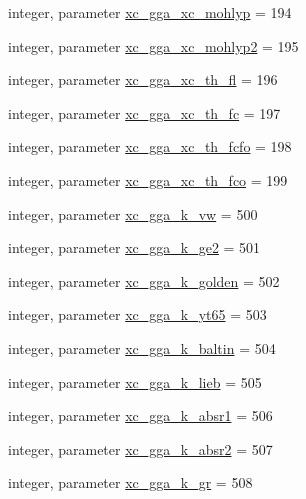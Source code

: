 \begin{DoxyCompactItemize}
\item 
integer, parameter \hyperlink{classlibxc__funcs__m_af627a530ca1f867510017b189507dfec}{xc\-\_\-gga\-\_\-xc\-\_\-mohlyp} = 194
\item 
integer, parameter \hyperlink{classlibxc__funcs__m_a85e87e7fd208c942e92ea7ba65d059a5}{xc\-\_\-gga\-\_\-xc\-\_\-mohlyp2} = 195
\item 
integer, parameter \hyperlink{classlibxc__funcs__m_aa04dcc0460f7a3a43e0a29bdec59524f}{xc\-\_\-gga\-\_\-xc\-\_\-th\-\_\-fl} = 196
\item 
integer, parameter \hyperlink{classlibxc__funcs__m_ab2a4479b768f91a95decd4dcce60ce92}{xc\-\_\-gga\-\_\-xc\-\_\-th\-\_\-fc} = 197
\item 
integer, parameter \hyperlink{classlibxc__funcs__m_a4c1444d5f088b32488ec4f04a0a6467d}{xc\-\_\-gga\-\_\-xc\-\_\-th\-\_\-fcfo} = 198
\item 
integer, parameter \hyperlink{classlibxc__funcs__m_a118c61bedf0f29ea879522d3cd301032}{xc\-\_\-gga\-\_\-xc\-\_\-th\-\_\-fco} = 199
\item 
integer, parameter \hyperlink{classlibxc__funcs__m_ae7cbe5f41b864af681ffea0a07ad6a37}{xc\-\_\-gga\-\_\-k\-\_\-vw} = 500
\item 
integer, parameter \hyperlink{classlibxc__funcs__m_a9a6842918af16d31f1a9346faf6b9345}{xc\-\_\-gga\-\_\-k\-\_\-ge2} = 501
\item 
integer, parameter \hyperlink{classlibxc__funcs__m_a60330d5d93aa1fd5eb63d044f2c2e309}{xc\-\_\-gga\-\_\-k\-\_\-golden} = 502
\item 
integer, parameter \hyperlink{classlibxc__funcs__m_a34ce616ab8d5b41e5c47367d78352aa5}{xc\-\_\-gga\-\_\-k\-\_\-yt65} = 503
\item 
integer, parameter \hyperlink{classlibxc__funcs__m_a3b6e77a50efec006507e25ac624b3972}{xc\-\_\-gga\-\_\-k\-\_\-baltin} = 504
\item 
integer, parameter \hyperlink{classlibxc__funcs__m_a50849aa41c2cb038ab166bc42b456210}{xc\-\_\-gga\-\_\-k\-\_\-lieb} = 505
\item 
integer, parameter \hyperlink{classlibxc__funcs__m_a1ff1b855a328bf878a0b4f241ab6f244}{xc\-\_\-gga\-\_\-k\-\_\-absr1} = 506
\item 
integer, parameter \hyperlink{classlibxc__funcs__m_acb001bb5f24fa794989e4dbb4390e58e}{xc\-\_\-gga\-\_\-k\-\_\-absr2} = 507
\item 
integer, parameter \hyperlink{classlibxc__funcs__m_ae5741ade48907246e7fb265b4621b0b6}{xc\-\_\-gga\-\_\-k\-\_\-gr} = 508
\item 

\end{DoxyCompactItemize}
